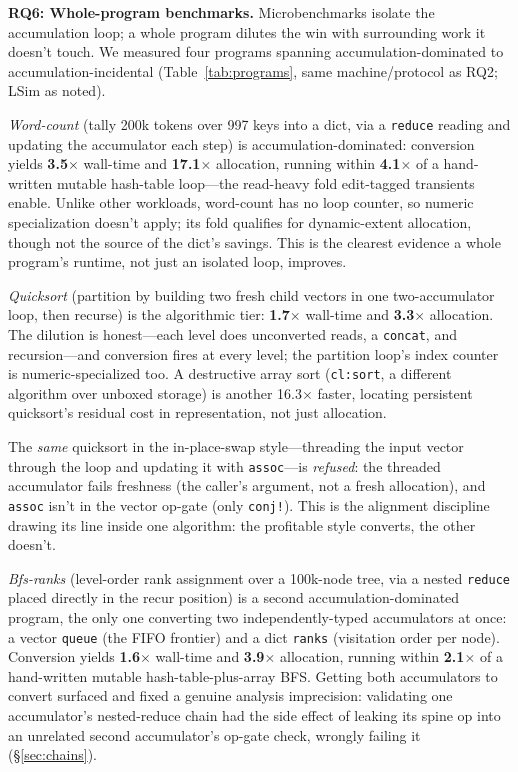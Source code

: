 \documentclass[sigplan,review,anonymous]{acmart}
\begin{document}
\textbf{RQ6: Whole-program benchmarks.} Microbenchmarks isolate the accumulation loop; a whole program dilutes the win with surrounding work it doesn't touch. We measured four programs spanning accumulation-dominated to accumulation-incidental (Table~\ref{tab:programs}, same machine/protocol as RQ2; LSim as noted).

\emph{Word-count} (tally 200k tokens over 997 keys into a dict, via a \texttt{reduce} reading and updating the accumulator each step) is accumulation-dominated: conversion yields \textbf{3.5$\times$} wall-time and \textbf{17.1$\times$} allocation, running within \textbf{4.1$\times$} of a hand-written mutable hash-table loop---the read-heavy fold edit-tagged transients enable. Unlike other workloads, word-count has no loop counter, so numeric specialization doesn't apply; its fold qualifies for dynamic-extent allocation, though not the source of the dict's savings. This is the clearest evidence a whole program's runtime, not just an isolated loop, improves.

\emph{Quicksort} (partition by building two fresh child vectors in one two-accumulator loop, then recurse) is the algorithmic tier: \textbf{1.7$\times$} wall-time and \textbf{3.3$\times$} allocation. The dilution is honest---each level does unconverted reads, a \texttt{concat}, and recursion---and conversion fires at every level; the partition loop's index counter is numeric-specialized too. A destructive array sort (\texttt{cl:sort}, a different algorithm over unboxed storage) is another 16.3$\times$ faster, locating persistent quicksort's residual cost in representation, not just allocation.

The \emph{same} quicksort in the in-place-swap style---threading the input vector through the loop and updating it with \texttt{assoc}---is \emph{refused}: the threaded accumulator fails freshness (the caller's argument, not a fresh allocation), and \texttt{assoc} isn't in the vector op-gate (only \texttt{conj!}). This is the alignment discipline drawing its line inside one algorithm: the profitable style converts, the other doesn't.

\emph{Bfs-ranks} (level-order rank assignment over a 100k-node tree, via a nested \texttt{reduce} placed directly in the recur position) is a second accumulation-dominated program, the only one converting two independently-typed accumulators at once: a vector \texttt{queue} (the FIFO frontier) and a dict \texttt{ranks} (visitation order per node). Conversion yields \textbf{1.6$\times$} wall-time and \textbf{3.9$\times$} allocation, running within \textbf{2.1$\times$} of a hand-written mutable hash-table-plus-array BFS. Getting both accumulators to convert surfaced and fixed a genuine analysis imprecision: validating one accumulator's nested-reduce chain had the side effect of leaking its spine op into an unrelated second accumulator's op-gate check, wrongly failing it (§\ref{sec:chains}).
\end{document}
